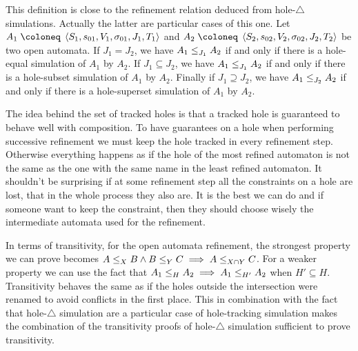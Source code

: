 \documentclass{article}
\begin{document}
This definition is close to the refinement relation deduced from hole-\(\triangle\) simulations.
Actually the latter are particular cases of this one.
Let \(A_1 \defobject \OAg[1]\) and \(A_2 \defobject \OAg[2]\) be two open automata.
If \(J_1 = J_2\), we have \(\wrel{A_1}{A_2}{J_1}\) if and only if there is a hole-equal simulation of \(A_1\) by \(A_2\).
If \(J_1 \subseteq J_2\), we have \(\wrel{A_1}{A_2}{J_1}\) if and only if there is a hole-subset simulation of \(A_1\) by \(A_2\).
Finally if \(J_1 \supseteq J_2\), we have \(\wrel{A_1}{A_2}{J_2}\) if and only if there is a hole-superset simulation of \(A_1\) by \(A_2\).

The idea behind the set of tracked holes is that a tracked hole is guaranteed to behave well with composition.
To have guarantees on a hole when performing successive refinement we must keep the hole tracked in every refinement step.
Otherwise everything happens as if the hole of the most refined automaton is not the same as the one with the same name in the least refined automaton.
It shouldn't be surprising if at some refinement step all the constraints on a hole are lost, that in the whole process they also are.
It is the best we can do and if someone want to keep the constraint, then they should choose wisely the intermediate automata used for the refinement.

In terms of transitivity, for the open automata refinement, the strongest property we can prove becomes \(\wrel{A}{B}{X} \wedge \wrel{B}{C}{Y} \implies \wrel{A}{C}{X \cap Y}\).
For a weaker property we can use the fact that \(\wrel{A_1}{A_2}{H} \implies \wrel{A_1}{A_2}{H'}\) when \(H' \subseteq H\).
Transitivity behaves the same as if the holes outside the intersection were renamed to avoid conflicts in the first place.
This in combination with the fact that hole-\(\triangle\) simulation are a particular case of hole-tracking simulation makes the combination of the transitivity proofs of hole-\(\triangle\) simulation sufficient to prove transitivity.
\end{document}
